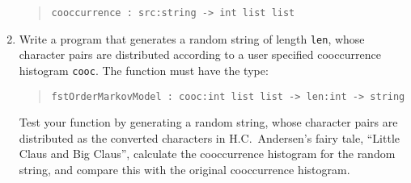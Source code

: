\begin{enumerate}
\begin{quote}
    \mbox{\lstinline!cooccurrence : src:string -> int list list!}
  \end{quote}
\item Write a program that generates a random string of length
  \lstinline!len!, whose character pairs are distributed according to
  a user specified cooccurrence histogram \lstinline!cooc!.  The
  function must have the type:
  \begin{quote}
    \mbox{\lstinline!fstOrderMarkovModel : cooc:int list list -> len:int -> string!}
  \end{quote}
  Test your function by generating a random string, whose character
  pairs are distributed as the converted characters in H.C.\
  Andersen's fairy tale, ``Little Claus and Big Claus'', calculate the
  cooccurrence histogram for the random string, and compare this with
  the original cooccurrence histogram.
\end{enumerate}
